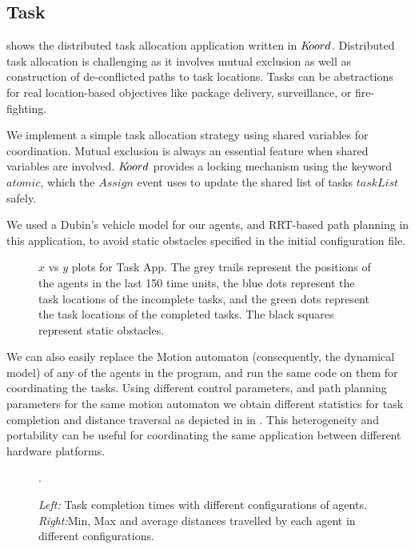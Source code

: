 \subsection{Task}

  shows the distributed task allocation application written in $K\kern-2pt oord$. Distributed task allocation is challenging as it involves mutual exclusion as well as construction of de-conflicted paths to task locations. Tasks can be abstractions for real location-based objectives like package delivery, surveillance, or fire-fighting. 

We implement a simple task allocation strategy using shared variables for coordination. Mutual exclusion is always an essential feature when shared variables are involved. $K\kern-2pt oord$ provides a locking mechanism using the keyword $\mathit{atomic}$, which the $\mathit{Assign}$ event uses to update the shared list of tasks $\mathit{taskList}$ safely. 

We used a Dubin's vehicle model for our agents, and RRT-based path planning in this application, to avoid static obstacles specified in the initial configuration file. 

\begin{figure}[h!]
\begin{minipage}{0.5\textwidth}
\end{minipage}%
\caption{$x$ vs $y$ plots for Task App. The grey trails represent the positions of the agents in the last 150 time units, the blue dots represent the task locations of the incomplete tasks, and the green dots represent the task locations of the completed tasks. The black squares represent static obstacles. }
\label{fig:taskplots}
\end{figure}
We can also easily replace the Motion automaton (consequently, the dynamical model) of any of the agents in the program, and run the same code on them for coordinating the tasks. Using different control parameters, and path planning parameters for the same motion automaton we obtain different statistics for task completion and distance traversal as depicted in in . This heterogeneity and portability can be useful for coordinating the same application between different hardware platforms.   
\begin{figure}[h!]
\begin{minipage}{0.5\textwidth}
\end{minipage}%
\caption{\small \emph{Left:} Task completion times with different configurations of agents. \emph{Right:}Min, Max and average distances travelled by each agent in different configurations.}. 
\label{fig:taskstats}
\end{figure}


